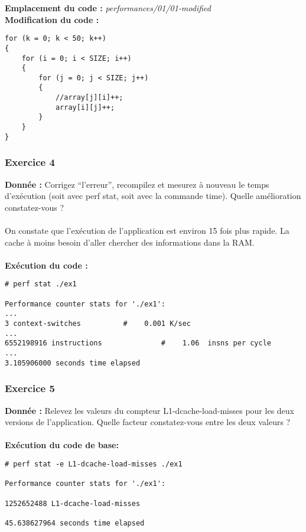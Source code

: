\textbf{Emplacement du code : }\textit{performances/01/01-modified}\\

\textbf{Modification du code : } \\
\begin{lstlisting}
for (k = 0; k < 50; k++)
{
	for (i = 0; i < SIZE; i++)
	{
		for (j = 0; j < SIZE; j++)
		{
			//array[j][i]++;
			array[i][j]++;
		}
	}
}
\end{lstlisting}

\subsubsection{Exercice 4}
\textbf{Donnée : } Corrigez	“l'erreur”,	recompilez	et	mesurez	à	nouveau	le	temps	d'exécution	(soit	avec	perf	stat,	soit	
avec	la	commande	time).	Quelle	amélioration	constatez-vous	?\\\\
On constate que l'exécution de l'application est environ 15 fois plus rapide. La cache à moins besoin d'aller chercher des informations dans la RAM.\\\\
\textbf{Exécution du code : } \\
\begin{lstlisting}
# perf stat ./ex1 

Performance counter stats for './ex1':
...      
3 context-switches          #    0.001 K/sec                  
...  
6552198916 instructions              #    1.06  insns per cycle        
...
3.105906000 seconds time elapsed

\end{lstlisting}

\subsubsection{Exercice 5}
\textbf{Donnée : } Relevez	les	valeurs	du	compteur	L1-dcache-load-misses	pour	les	deux	versions	de	l'application.	Quelle	
facteur	constatez-vous	entre	les	deux	valeurs	?\\\\

\textbf{Exécution du code de base: } \\
\begin{lstlisting}
# perf stat -e L1-dcache-load-misses ./ex1 

Performance counter stats for './ex1':

1252652488 L1-dcache-load-misses                                       

45.638627964 seconds time elapsed
\end{lstlisting}

